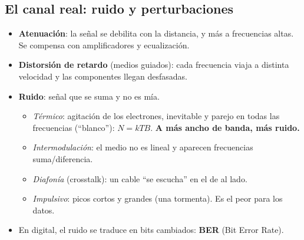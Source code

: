 \documentclass[10pt,a4paper]{article}
\newcommand{\term}[1]{\textbf{\color{azul}#1}}
\begin{document}
\subsection{El canal real: ruido y perturbaciones}
\begin{itemize}
  \item \term{Atenuación}: la señal se debilita con la distancia, y más a frecuencias altas. Se compensa con amplificadores y ecualización.
  \item \term{Distorsión de retardo} (medios guiados): cada frecuencia viaja a distinta velocidad y las componentes llegan desfasadas.
  \item \term{Ruido}: señal que se suma y no es mía.
    \begin{itemize}
      \item \emph{Térmico}: agitación de los electrones, inevitable y parejo en todas las frecuencias (``blanco''): $N = kTB$. \textbf{A más ancho de banda, más ruido.}
      \item \emph{Intermodulación}: el medio no es lineal y aparecen frecuencias suma/diferencia.
      \item \emph{Diafonía} (crosstalk): un cable ``se escucha'' en el de al lado.
      \item \emph{Impulsivo}: picos cortos y grandes (una tormenta). Es el peor para los datos.
    \end{itemize}
  \item En digital, el ruido se traduce en bits cambiados: \term{BER} (Bit Error Rate).
\end{itemize}
\end{document}
